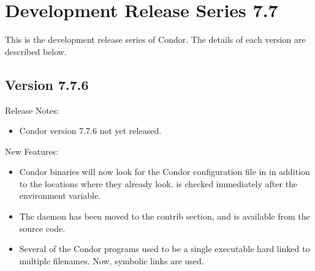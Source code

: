 
\section{\label{sec:History-7-7}Development Release Series 7.7}

This is the development release series of Condor.
The details of each version are described below.

\subsection*{\label{sec:New-7-7-6}Version 7.7.6}

\noindent Release Notes:

\begin{itemize}

\item Condor version 7.7.6 not yet released.

\end{itemize}


\noindent New Features:

\begin{itemize}

\item Condor binaries will now look for the Condor configuration file in
 in addition to the locations where
they already look.
 is checked immediately after the 
 environment variable.

\item The  daemon has been moved to the contrib section, and is 
available from the source code.

\item Several of the Condor programs used to be a single executable
hard linked to multiple filenames. Now, symbolic links are used.

\end{itemize}

